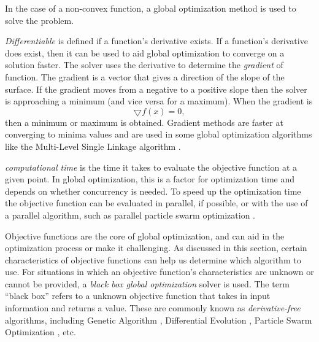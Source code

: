 In the case of a non-convex function, a global optimization method is used to solve the problem. 

\textit{Differentiable} is defined if a function's derivative exists. If a function's derivative does exist, then it can be used to aid global optimization to converge on a solution faster. The solver uses the derivative to determine the \textit{gradient} of function. The gradient is a vector that gives a direction of the slope of the surface. If the gradient moves from a negative to a positive slope then the solver is approaching a minimum (and vice versa for a maximum). When the gradient is
\begin{equation}
    \bigtriangledown f(x) = 0,
\end{equation}
then a minimum or maximum is obtained. Gradient methods are faster at converging to minima values and are used in some global optimization algorithms like the Multi-Level Single Linkage algorithm \cite{Liberti2000}.

\textit{computational time} is the time it takes to evaluate the objective function at a given point. In global optimization, this is a factor for optimization time and depends on whether concurrency is needed. To speed up the optimization time the objective function can be evaluated in parallel, if possible, or with the use of a parallel algorithm, such as parallel particle swarm optimization \cite{Hung2012}. 

Objective functions are the core of global optimization, and can aid in the optimization process or make it challenging. As discussed in this section, certain characteristics of objective functions can help us determine which algorithm to use. For situations in which an objective function's characteristics are unknown or cannot be provided, a \textit{black box global
optimization} solver is used. The term ``black box'' refers to a unknown objective function that takes in input information and returns a value. These are commonly known as \textit{derivative-free} algorithms, including Genetic Algorithm \cite{Aguiar}, Differential Evolution \cite{Aguiar}, Particle Swarm Optimization \cite{Kennedy1995}, etc.



